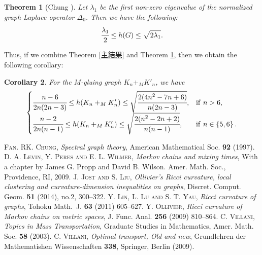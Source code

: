 \documentclass[leqno,12pt]{amsart} %
\theoremstyle{plain} %
\newtheorem{theorem}{\indent\sc Theorem}[section] %
\newtheorem{corollary}[theorem]{\indent\sc Corollary}
\theoremstyle{definition} %
\begin{document}
\begin{theorem}[Chung \cite{ch}]
\label{Ch}
Let $\lambda_{1}$ be the first non-zero eigenvalue of the normalized graph Laplace operator $\Delta_{0}$. Then we have the following:
\begin{eqnarray*}
\cfrac{\lambda_{1}}{2} \leq h(G) \leq \sqrt{2 \lambda_{1}}.
\end{eqnarray*}
\end{theorem} 
Thus, if we combine Theorem \ref{主結果} and Theorem \ref{Ch}, then we obtain the following corollary:
\begin{corollary}
For the $M$-gluing graph $K_n +_M K'_n$, we have
\begin{eqnarray*}
\begin{cases}
\cfrac{n-6}{2n(2n-3)} \leq h(K_n +_M K'_n) \leq \sqrt{\cfrac{2(4n^2 -7n +6)}{n(2n-3)}}, & \mathrm{if}\ n>6,\\
\cfrac{n-2}{2n(n-1)} \leq h(K_n +_M K'_n) \leq\sqrt{\cfrac{2(n^2 -2n +2)}{n(n-1)}}, & \mathrm{if}\ n \in \left\{5, 6\right\}.
\end{cases}
\end{eqnarray*}
\end{corollary}
















\begin{thebibliography}{14}
\textsc{Fan. RK. Chung}, {\em Spectral graph theory}, American Mathematical Soc. {\bf 92}  (1997).
\textsc{D. A. Levin, Y. Peres and E. L. Wilmer}, {\em Markov chains and mixing times}, With a chapter by James G. Propp and David B. Wilson. Amer. Math. Soc., Providence, RI, 2009.
\textsc{J. Jost and S. Liu}, {\em Ollivier's Ricci curvature, local clustering and curvature-dimension inequalities on graphs}, Discret. Comput. Geom. {\bf 51} (2014), no.2, 300--322.
\textsc{Y. Lin, L. Lu and S. T. Yau}, {\em Ricci curvature of graphs}, Tohoku Math.\ J. {\bf 63} (2011) 605--627.
\textsc{Y. Ollivier}, {\em Ricci curvature of Markov chains on metric spaces}, J. Func. Anal. {\bf 256} (2009) 810--864.
\textsc{C. Villani}, {\em Topics in Mass Transportation}, Graduate Studies in Mathematics, Amer. Math. Soc. {\bf 58} (2003).
\textsc{C. Villani}, {\em Optimal transport, Old and new}, Grundlehren der Mathematishen Wissenschaften {\bf 338}, Springer, Berlin (2009).
\end{thebibliography}




    
    
\end{document}
